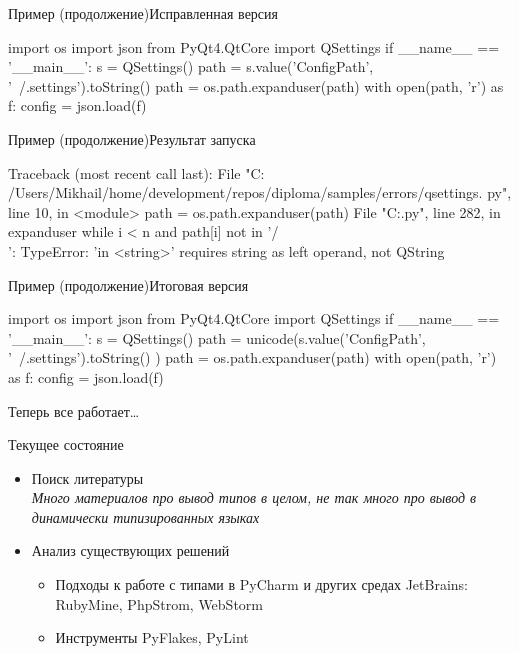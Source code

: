 \documentclass{beamer}
\begin{document}
\begin{frame}[fragile]{Пример (продолжение)}{Исправленная версия}
\begin{pythoncode}
import os
import json
from PyQt4.QtCore import QSettings
if __name__ == '__main__':
   s = QSettings()
   path = s.value('ConfigPath', '~/.settings').toString()
   path = os.path.expanduser(path)
   with open(path, 'r') as f:
       config = json.load(f)
\end{pythoncode}
\end{frame}


\begin{frame}[fragile]{Пример (продолжение)}{Результат запуска}
\begin{pythoncode}
Traceback (most recent call last): 
File "C: /Users/Mikhail/home/development/repos/diploma/samples/errors/qsettings.
py", line 10, in <module>
 path = os.path.expanduser(path)
 File "C:\lib\ntpath.py", line 282, in expanduser
 while i < n and path[i] not in '/\\':
TypeError: 'in <string>' requires string as left operand, not QString
\end{pythoncode}
\end{frame}


\begin{frame}[fragile]{Пример (продолжение)}{Итоговая версия}
\begin{pythoncode}
import os
import json
from PyQt4.QtCore import QSettings
if __name__ == '__main__':
    s = QSettings()
    path = unicode(s.value('ConfigPath', '~/.settings').toString() )
    path = os.path.expanduser(path)
    with open(path, 'r') as f:
        config = json.load(f)
\end{pythoncode}

Теперь все работает\ldots

\end{frame}

\begin{frame}{Текущее состояние}
\begin{itemize}
  \item Поиск литературы \\
  \small{\emph{Много материалов про вывод типов в целом, не так много про вывод в динамически типизированных языках}}

  \item Анализ существующих решений
    \begin{itemize}
      \item Подходы к работе с типами в PyCharm и других средах JetBrains: 
      RubyMine, PhpStrom, WebStorm
      \item Инструменты PyFlakes, PyLint
    \end{itemize}
\end{itemize}
\end{frame}
\end{document}
